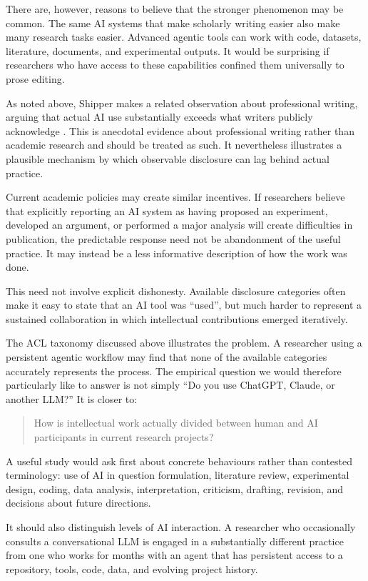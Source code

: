 \documentclass[12pt]{article}
\begin{document}
There are, however, reasons to believe that the stronger phenomenon may be common. The same AI systems that make scholarly writing easier also make many research tasks easier. Advanced agentic tools can work with code, datasets, literature, documents, and experimental outputs. It would be surprising if researchers who have access to these capabilities confined them universally to prose editing.

As noted above, Shipper makes a related observation about professional writing, arguing that actual AI use substantially exceeds what writers publicly acknowledge \citep{newton2026editorclone}. This is anecdotal evidence about professional writing rather than academic research and should be treated as such. It nevertheless illustrates a plausible mechanism by which observable disclosure can lag behind actual practice.

Current academic policies may create similar incentives.
If researchers believe that explicitly reporting an AI system as having proposed an experiment, developed an argument, or performed a major analysis will create difficulties in publication, the predictable response need not be abandonment of the useful practice. It may instead be a less informative description of how the work was done.

This need not involve explicit dishonesty. Available disclosure categories often make it easy to state that an AI tool was ``used'', but much harder to represent a sustained collaboration in which intellectual contributions emerged iteratively.

The ACL taxonomy discussed above illustrates the problem. A researcher using a persistent agentic workflow may find that none of the available categories accurately represents the process.
The empirical question we would therefore particularly like to answer is not simply ``Do you use ChatGPT, Claude, or another LLM?'' It is closer to:
\begin{quote}
How is intellectual work actually divided between human and AI participants in current research projects?
\end{quote}
A useful study would ask first about concrete behaviours rather than contested terminology: use of AI in question formulation, literature review, experimental design, coding, data analysis, interpretation, criticism, drafting, revision, and decisions about future directions.

It should also distinguish levels of AI interaction. A researcher who occasionally consults a conversational LLM is engaged in a substantially different practice from one who works for months with an agent that has persistent access to a repository, tools, code, data, and evolving project history.
\end{document}
